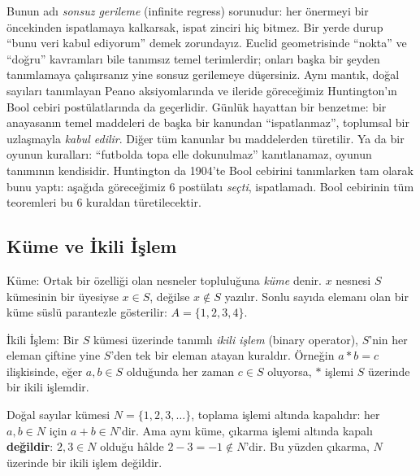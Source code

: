 \begin{bilginot}
Bunun adı \emph{sonsuz gerileme} (infinite regress) sorunudur: her önermeyi bir öncekinden
ispatlamaya kalkarsak, ispat zinciri hiç bitmez. Bir yerde durup ``bunu veri kabul ediyorum''
demek zorundayız. Euclid geometrisinde ``nokta'' ve ``doğru'' kavramları bile tanımsız temel
terimlerdir; onları başka bir şeyden tanımlamaya çalışırsanız yine sonsuz gerilemeye
düşersiniz. Aynı mantık, doğal sayıları tanımlayan Peano aksiyomlarında ve ileride
göreceğimiz Huntington'ın Bool cebiri postülatlarında da geçerlidir. Günlük hayattan bir
benzetme: bir anayasanın temel maddeleri de başka bir kanundan ``ispatlanmaz'', toplumsal bir
uzlaşmayla \emph{kabul edilir}. Diğer tüm kanunlar bu maddelerden türetilir. Ya da bir
oyunun kuralları: ``futbolda topa elle dokunulmaz'' kanıtlanamaz, oyunun tanımının kendisidir.
Huntington da 1904'te Bool cebirini tanımlarken tam olarak bunu yaptı: aşağıda göreceğimiz 6
postülatı \emph{seçti}, ispatlamadı. Bool cebirinin tüm teoremleri bu 6 kuraldan
türetilecektir.
\end{bilginot}

\subsection{Küme ve İkili İşlem}
\label{sec:kume-ikili-islem}

\begin{tanim}{Küme:}
Ortak bir özelliği olan nesneler topluluğuna \emph{küme} denir. $x$ nesnesi $S$
kümesinin bir üyesiyse $x\in S$, değilse $x\notin S$ yazılır. Sonlu sayıda elemanı olan bir
küme süslü parantezle gösterilir: $A=\{1,2,3,4\}$.
\end{tanim}

\begin{tanim}{İkili İşlem:}
Bir $S$ kümesi üzerinde tanımlı \emph{ikili işlem} (binary operator),
$S$'nin her eleman çiftine yine $S$'den tek bir eleman atayan kuraldır. Örneğin $a*b=c$
ilişkisinde, eğer $a,b\in S$ olduğunda her zaman $c\in S$ oluyorsa, $*$ işlemi $S$ üzerinde
bir ikili işlemdir.
\end{tanim}

\begin{ornek}
Doğal sayılar kümesi $N=\{1,2,3,\ldots\}$, toplama işlemi altında kapalıdır: her
$a,b\in N$ için $a+b\in N$'dir. Ama aynı küme, çıkarma işlemi altında kapalı
\textbf{değildir}: $2,3\in N$ olduğu hâlde $2-3=-1\notin N$'dir. Bu yüzden çıkarma, $N$
üzerinde bir ikili işlem değildir.
\end{ornek}

